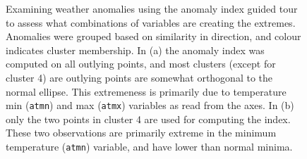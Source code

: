 \documentclass[
  12pt,
]{interact}
\begin{document}
\begin{figure}

\begin{minipage}{0.50\linewidth}



\end{minipage}%
%
\begin{minipage}{0.50\linewidth}



\end{minipage}%

\caption{\label{fig-weather}Examining weather anomalies using the
anomaly index guided tour to assess what combinations of variables are
creating the extremes. Anomalies were grouped based on similarity in
direction, and colour indicates cluster membership. In (a) the anomaly
index was computed on all outlying points, and most clusters (except for
cluster 4) are outlying points are somewhat orthogonal to the normal
ellipse. This extremeness is primarily due to temperature min
(\texttt{atmn}) and max (\texttt{atmx}) variables as read from the axes.
In (b) only the two points in cluster 4 are used for computing the
index. These two observations are primarily extreme in the minimum
temperature (\texttt{atmn}) variable, and have lower than normal
minima.}

\end{figure}%
\end{document}
